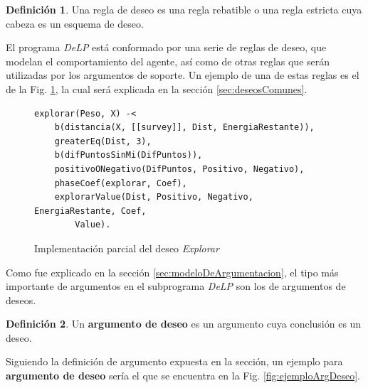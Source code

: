 \documentclass[oneside]{book}
\theoremstyle{definition}
\newtheorem{definicion}{Definición}[section]
\theoremstyle{example}
\newcommand{\drule}[2]{\mbox{$ #1\; \defleftarrow \; #2$}}
\newcommand{\defleftarrow}{{\raise1.5pt\hbox{\tiny\defleft}}}
\newcommand{\defleft}{\mbox{---\hspace{-1.5pt}\raise.05pt\hbox{$<$}}}
\newcommand{\bigAS}[2]{$\bigl\langle \{#1\}, #2 \bigr\rangle $}
\newcommand{\nlA}[1]{$$\mbox{#1}$$}
\begin{document}
\begin{definicion}
Una {regla de deseo} es una regla rebatible o una regla estricta cuya cabeza es un esquema 
de deseo.
\end{definicion}

El programa \textit{DeLP} está conformado por una serie de reglas de deseo, que modelan
el comportamiento del agente, así como de otras reglas que serán utilizadas por los 
argumentos de soporte. Un ejemplo de una de estas reglas es el de la Fig. 
\ref{fig:deseoExplorar}, la cual será explicada en la sección \ref{sec:deseosComunes}.

\begin{figure}
\begin{verbatim}
explorar(Peso, X) -<
    b(distancia(X, [[survey]], Dist, EnergiaRestante)),
    greaterEq(Dist, 3),
    b(difPuntosSinMi(DifPuntos)),
    positivoONegativo(DifPuntos, Positivo, Negativo),
    phaseCoef(explorar, Coef),
    explorarValue(Dist, Positivo, Negativo, EnergiaRestante, Coef,
    	Value).
\end{verbatim}
\caption{Implementación parcial del deseo \emph{Explorar}}
\label{fig:deseoExplorar}
\end{figure}

Como fue explicado en la sección \ref{sec:modeloDeArgumentacion}, el tipo más importante de 
argumentos en el subprograma \textit{DeLP} son los de argumentos de deseos. 

\begin{definicion}
	Un \textbf{argumento de deseo} es un argumento cuya conclusión es un deseo.
\end{definicion}

Siguiendo la definición de argumento expuesta en la sección, un ejemplo para
\textbf{argumento de deseo} sería el que se encuentra en la Fig. 
\ref{fig:ejemploArgDeseo}.

\end{document}
